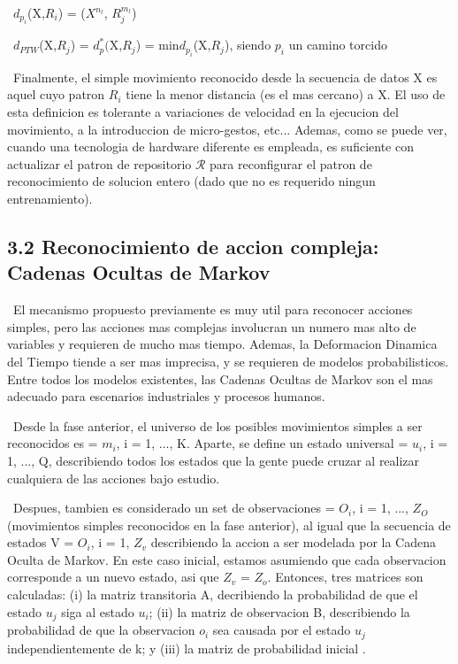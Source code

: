 \documentclass{paper}
\begin{document}
\ $d_{p_i}$(X,$R_i$) = \sum($X^{n_l}$, $R_j^{m_l}$)

\ $d_{PTW}$(X,$R_j$) = $d_p^*($X,$R_j$) = min{$d_{p_i}$(X,$R_j$), siendo $p_i$ un camino torcido}

\ Finalmente, el simple movimiento reconocido desde la secuencia de datos X es aquel cuyo patron $R_i$ tiene la menor distancia (es el mas cercano) a X. El uso de esta definicion es tolerante a variaciones de velocidad en la ejecucion del movimiento, a la introduccion de micro-gestos, etc... Ademas, como se puede ver, cuando una tecnologia de hardware diferente es empleada, es suficiente con actualizar el patron de repositorio $\mathcal{R}$ para reconfigurar el patron de reconocimiento de solucion entero (dado que no es requerido ningun entrenamiento).


\subsection*{3.2 Reconocimiento de accion compleja: Cadenas Ocultas de Markov}

\ El mecanismo propuesto previamente es muy util para reconocer acciones simples, pero las acciones mas complejas involucran un numero mas alto de variables y requieren de mucho mas tiempo. Ademas, la Deformacion Dinamica del Tiempo tiende a ser mas imprecisa, y se requieren de modelos probabilisticos. Entre todos los modelos existentes, las Cadenas Ocultas de Markov son el mas adecuado para escenarios industriales y procesos humanos.

\ Desde la fase anterior, el universo de los posibles movimientos simples a ser reconocidos es  = {$m_i$, i = 1, ..., K}. Aparte, se define un estado universal  = {$u_i$, i = 1, ..., Q}, describiendo todos los estados que la gente puede cruzar al realizar cualquiera de las acciones bajo estudio.

\ Despues, tambien es considerado un set de observaciones  = {$O_i$, i = 1, ..., $Z_O$} (movimientos simples reconocidos en la fase anterior), al igual que la secuencia de estados V = {$O_i$, i = 1, $Z_v$} describiendo la accion a ser modelada por la Cadena Oculta de Markov. En este caso inicial, estamos asumiendo que cada observacion corresponde a un nuevo estado, asi que $Z_v$ = $Z_o$. Entonces, tres matrices son calculadas: (i) la matriz transitoria A, decribiendo la probabilidad de que el estado $u_j$ siga al estado $u_i$; (ii) la matriz de observacion B, describiendo la probabilidad de que la observacion $o_i$ sea causada por el estado $u_j$ independientemente de k; y (iii) la matriz de probabilidad inicial \prod.
\end{document}
